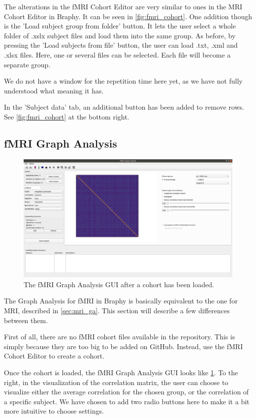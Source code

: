\documentclass{article}
\begin{document}
The alterations in the fMRI Cohort Editor are very similar to ones in the MRI Cohort Editor in Braphy. It can be seen in \cref{fig:fmri_cohort}. One addition though is the 'Load subject group from folder' button. It lets the user select a whole folder of .xslx subject files and load them into the same group. As before, by pressing the 'Load subjects from file' button, the user can load .txt, .xml and .xlsx files. Here, one or several files can be selected. Each file will become a separate group. 

We do not have a window for the repetition time here yet, as we have not fully understood what meaning it has.

In the 'Subject data' tab, an additional button has been added to remove rows. See \cref{fig:fmri_cohort} at the bottom right.

\subsection{fMRI Graph Analysis}

\begin{figure}[h]
    \centering
    \includegraphics[width=\linewidth]{fmri_ga.png}
    \caption{The fMRI Graph Analysis GUI after a cohort has been loaded.}
    \label{fig:fmri_ga}
\end{figure}

The Graph Analysis for fMRI in Braphy is basically equivalent to the one for MRI, described in \cref{sec:mri_ga}. This section will describe a few differences between them. 

First of all, there are no fMRI cohort files available in the repository. This is simply because they are too big to be added on GitHub. Instead, use the fMRI Cohort Editor to create a cohort.

Once the cohort is loaded, the fMRI Graph Analysis GUI looks like \cref{fig:fmri_ga}. To the right, in the visualization of the correlation matrix, the user can choose to visualize either the average correlation for the chosen group, or the correlation of a specific subject. We have chosen to add two radio buttons here to make it a bit more intuitive to choose settings.
\end{document}
